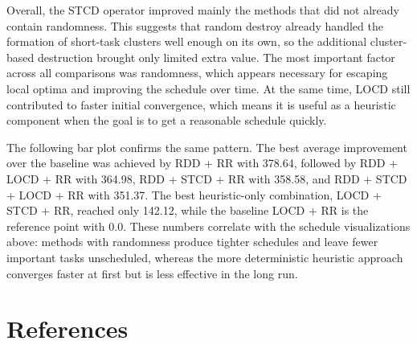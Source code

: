 \documentclass{article}
\begin{document}
Overall, the STCD operator improved mainly the methods that did not already contain randomness. This suggests that random destroy already handled the formation of short-task clusters well enough on its own, so the additional cluster-based destruction brought only limited extra value. The most important factor across all comparisons was randomness, which appears necessary for escaping local optima and improving the schedule over time. At the same time, LOCD still contributed to faster initial convergence, which means it is useful as a heuristic component when the goal is to get a reasonable schedule quickly.

The following bar plot confirms the same pattern. The best average improvement over the baseline was achieved by RDD + RR with 378.64, followed by RDD + LOCD + RR with 364.98, RDD + STCD + RR with 358.58, and RDD + STCD + LOCD + RR with 351.37. The best heuristic-only combination, LOCD + STCD + RR, reached only 142.12, while the baseline LOCD + RR is the reference point with 0.0. These numbers correlate with the schedule visualizations above: methods with randomness produce tighter schedules and leave fewer important tasks unscheduled, whereas the more deterministic heuristic approach converges faster at first but is less effective in the long run.

\section*{References}
\end{document}
